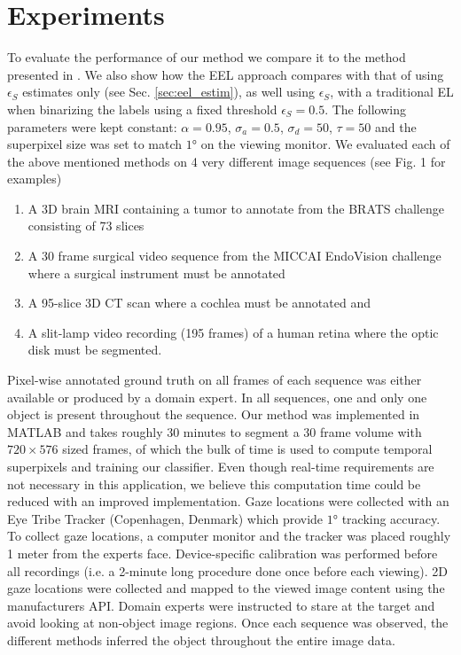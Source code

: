 \section{Experiments}
\label{sec:eel_exp}
To evaluate the performance of our method we compare it to the method presented in \cite{vilarino07}.
We also show how the EEL approach compares with that of using $\epsilon_{S}$ estimates only
(see Sec. \ref{sec:eel_estim}), as well using $\epsilon_{S}$, with a traditional EL when binarizing the labels using a fixed
threshold $\epsilon_{S}=0.5$.
The following parameters were kept constant: $\alpha=0.95$, $\sigma_{a}=0.5$, $\sigma_{d}=50$, $\tau = 50$ and the superpixel size was set to match $1°$ on the viewing monitor.
We evaluated each of the above mentioned methods on 4 very different image sequences (see
Fig. 1 for examples)

\begin{enumerate}
\item A 3D brain MRI containing a tumor to annotate from the BRATS
challenge \cite{BRATSChall} consisting of 73 slices
\item A 30 frame surgical video sequence from the MICCAI
EndoVision challenge \cite{endochal} where a surgical instrument must be annotated
\item A 95-slice 3D CT scan where a cochlea must be annotated and
\item A slit-lamp video recording (195 frames) of a human retina where the optic disk must be segmented.
\end{enumerate}

Pixel-wise annotated ground truth
on all frames of each sequence was either available or produced by a domain expert.
In all sequences, one and only one object is present throughout the sequence.
Our method was implemented in MATLAB and takes roughly 30 minutes to segment a
30 frame volume with $720 \times 576$ sized frames, of which the bulk of time is used to compute
temporal superpixels and training our classifier.
Even though real-time requirements are not necessary in this application, we believe this computation time could be reduced with an improved implementation.
Gaze locations were collected with an Eye Tribe Tracker (Copenhagen, Denmark) which provide
$1°$ tracking accuracy.
To collect gaze locations, a computer monitor and the tracker
was placed roughly 1 meter from the experts face.
Device-specific calibration was performed before all recordings (i.e. a 2-minute long procedure done once before each viewing).
2D gaze locations were collected and mapped to the viewed image content using the manufacturers API.
Domain experts were instructed to stare at the target and avoid looking at non-object image
regions.
Once each sequence was observed, the different methods inferred the object throughout
the entire image data.

